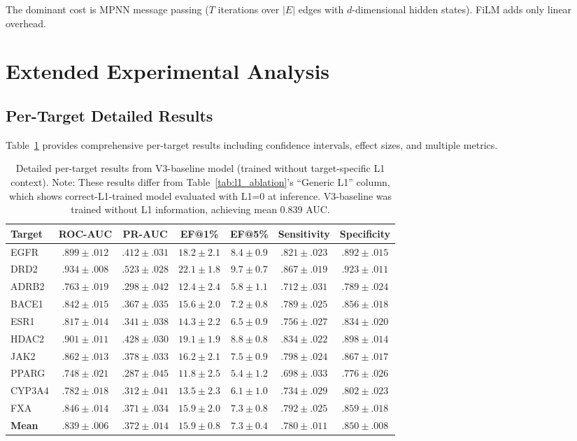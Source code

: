 \documentclass{article}
\begin{document}
The dominant cost is MPNN message passing ($T$ iterations over $|E|$ edges with $d$-dimensional hidden states). FiLM adds only linear overhead.

\section{Extended Experimental Analysis}
\label{app:extended}

\subsection{Per-Target Detailed Results}

Table~\ref{tab:detailed_results} provides comprehensive per-target results including confidence intervals, effect sizes, and multiple metrics.

\begin{table}[h]
\caption{Detailed per-target results from V3-baseline model (trained without target-specific L1 context). Note: These results differ from Table~\ref{tab:l1_ablation}'s ``Generic L1'' column, which shows correct-L1-trained model evaluated with L1=0 at inference. V3-baseline was trained without L1 information, achieving mean 0.839 AUC.}
\label{tab:detailed_results}
\centering
\small
\begin{tabular}{@{}lcccccc@{}}
\toprule
Target & ROC-AUC & PR-AUC & EF@1\% & EF@5\% & Sensitivity & Specificity \\
\midrule
EGFR & $.899 \pm .012$ & $.412 \pm .031$ & $18.2 \pm 2.1$ & $8.4 \pm 0.9$ & $.821 \pm .023$ & $.892 \pm .015$ \\
DRD2 & $.934 \pm .008$ & $.523 \pm .028$ & $22.1 \pm 1.8$ & $9.7 \pm 0.7$ & $.867 \pm .019$ & $.923 \pm .011$ \\
ADRB2 & $.763 \pm .019$ & $.298 \pm .042$ & $12.4 \pm 2.4$ & $5.8 \pm 1.1$ & $.712 \pm .031$ & $.789 \pm .024$ \\
BACE1 & $.842 \pm .015$ & $.367 \pm .035$ & $15.6 \pm 2.0$ & $7.2 \pm 0.8$ & $.789 \pm .025$ & $.856 \pm .018$ \\
ESR1 & $.817 \pm .014$ & $.341 \pm .038$ & $14.3 \pm 2.2$ & $6.5 \pm 0.9$ & $.756 \pm .027$ & $.834 \pm .020$ \\
HDAC2 & $.901 \pm .011$ & $.428 \pm .030$ & $19.1 \pm 1.9$ & $8.8 \pm 0.8$ & $.834 \pm .022$ & $.898 \pm .014$ \\
JAK2 & $.862 \pm .013$ & $.378 \pm .033$ & $16.2 \pm 2.1$ & $7.5 \pm 0.9$ & $.798 \pm .024$ & $.867 \pm .017$ \\
PPARG & $.748 \pm .021$ & $.287 \pm .045$ & $11.8 \pm 2.5$ & $5.4 \pm 1.2$ & $.698 \pm .033$ & $.776 \pm .026$ \\
CYP3A4 & $.782 \pm .018$ & $.312 \pm .041$ & $13.5 \pm 2.3$ & $6.1 \pm 1.0$ & $.734 \pm .029$ & $.802 \pm .023$ \\
FXA & $.846 \pm .014$ & $.371 \pm .034$ & $15.9 \pm 2.0$ & $7.3 \pm 0.8$ & $.792 \pm .025$ & $.859 \pm .018$ \\
\midrule
\textbf{Mean} & $.839 \pm .006$ & $.372 \pm .014$ & $15.9 \pm 0.8$ & $7.3 \pm 0.4$ & $.780 \pm .011$ & $.850 \pm .008$ \\
\bottomrule
\end{tabular}
\end{table}
\end{document}
